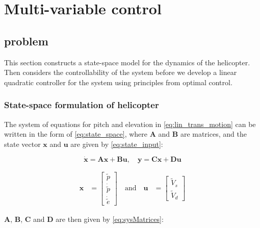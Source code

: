 \section{Multi-variable control}\label{sec:part3}

\subsection{problem}
This section constructs a state-space model for the dynamics of the helicopter. Then considers the controllability of the system before we develop a linear quadratic controller for the system using principles from optimal control\cite{Chen2014}.

\subsubsection{State-space formulation of helicopter}
The system of equations for pitch and elevation in \cref{eq:lin_trans_motion} can be written in the form of \cref{eq:state_space}, where $\mathbf{A}$ and $\mathbf{B}$ are matrices, and the state vector $\mathbf{x}$ and $\mathbf{u}$ are given by \cref{eq:state_input}:

\begin{equation}\label{eq:state_space}
        \mathbf{\dot{x} = Ax + Bu},
        \quad
        \mathbf{y = Cx + Du}
\end{equation}

\begin{equation}\label{eq:state_input}
    \begin{aligned}
        \mathbf{x} &= \begin{bmatrix} \tilde{p} \\ \dot{\tilde{p}} \\ \dot{\tilde{e}} \end{bmatrix}
        \quad \textrm{and} \quad
        \mathbf{u} &= \begin{bmatrix} \tilde{V}_s \\ \tilde{V}_d \end{bmatrix}
    \end{aligned}
\end{equation}

$\mathbf{A}$, $\mathbf{B}$, $\mathbf{C}$ and $\mathbf{D}$ are then given by \cref{eq:sysMatrices}:

